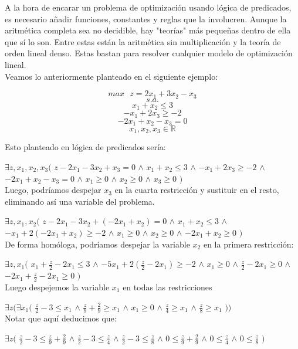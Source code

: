 \documentclass[runningheads]{llncs}
\begin{document}
A la hora de encarar un problema de optimización usando lógica de predicados, es necesario añadir funciones, constantes y reglas que la involucren. Aunque la aritmética completa sea no decidible, hay "teorías" más pequeñas dentro de ella que sí lo son. Entre estas están la aritmética sin multiplicación y la teoría de orden lineal denso. Estas bastan para resolver cualquier modelo de optimización lineal.\\

Veamos lo anteriormente planteado en el siguiente ejemplo:

$$max \text{ }z= 2x_1 + 3x_2 - x_3 $$
$$s.a.$$
$$ x_1 + x_2 \leq  3 $$
$$ -x_1 + 2x_3 \geq  -2 $$
$$ -2x_1 + x_2 - x_3 = 0 $$
$$ x_1, x_2, x_3 \in \mathbb{R}  $$

Esto planteado en lógica de predicados sería:

$\exists z,x_1,x_2,x_3 ($
$z - 2x_1 - 3x_2 + x_3 = 0$ $\land$
$ x_1 + x_2 \leq  3 $ $\land$
$ -x_1 + 2x_3 \geq  -2 $ $\land$
$ -2x_1 + x_2 - x_3 = 0 $ $\land$
$ x_1\geq  0 $ $\land$ 
$ x_2\geq  0 $ $\land$ 
$ x_3\geq  0 $ 
$)$\\

Luego, podríamos despejar $x_3$ en la cuarta restricción y sustituir en el resto, eliminando así una variable del problema.

$\exists z,x_1,x_2($
$z - 2x_1 - 3x_2 + (-2x_1 + x_2) = 0$ $\land$
$ x_1 + x_2 \leq  3 $ $\land$
$ -x_1 + 2(-2x_1 + x_2) \geq  -2 $ $\land$
$ x_1\geq  0 $ $\land$ 
$ x_2\geq  0 $ $\land$ 
$ -2x_1 + x_2\geq  0 $ 
$)$\\

De forma homóloga, podríamos despejar la variable $x_2$ en la primera restricción:

$\exists z,x_1 ($
$ x_1 + \frac z 2 -2x_1 \leq  3 $ $\land$
$ -5x_1 + 2(\frac z 2 -2x_1) \geq  -2 $ $\land$
$ x_1\geq  0 $ $\land$ 
$ \frac z 2 -2x_1 \geq  0 $ $\land$ 
$ -2x_1 + \frac z 2 -2x_1 \geq  0 $
$)$\\

Luego despejemos la variable $x_1$ en todas las restricciones

$\exists z (\exists x_1 ($
$ \frac z 2 - 3 \leq   x_1 $ $\land$
$ \frac z 9 + \frac 2 9 \geq  x_1 $ $\land$
$ x_1\geq  0 $ $\land$ 
$ \frac z 4 \geq  x_1 $ $\land$ 
$ \frac z 8 \geq  x_1 $ $))$\\

Notar que aquí deducimos que:

$\exists z ($
$ \frac z 2 - 3 \leq   \frac z 9 + \frac 2 9 $ $\land$
$ \frac z 2 - 3 \leq  \frac z 4  $ $\land$
$ \frac z 2 - 3 \leq  \frac z 8 $ $\land$
$ 0 \leq   \frac z 9 + \frac 2 9 $ $\land$
$ 0 \leq  \frac z 4  $ $\land$
$ 0 \leq  \frac z 8 $ 
$)$\\
\end{document}
